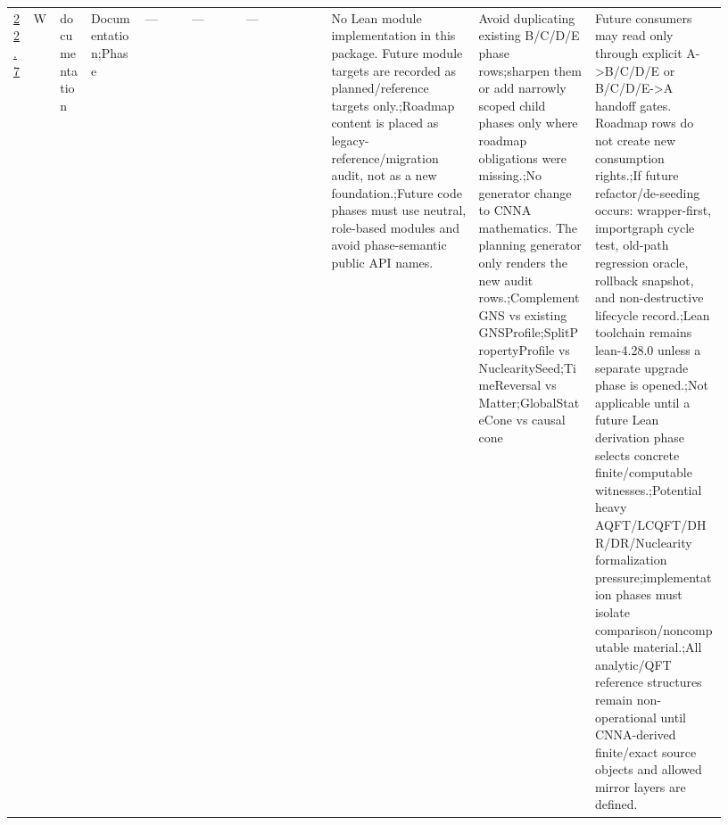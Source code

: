 \begin{longtable}{L{0.026\linewidth} L{0.024\linewidth} L{0.045\linewidth} L{0.07\linewidth} L{0.065\linewidth} L{0.075\linewidth} L{0.11\linewidth} L{0.19\linewidth} L{0.155\linewidth} L{0.17\linewidth}}
\hline
\addlinespace[0.24em]
\hyperlink{phase-row-22-7}{22.7} & W & documentation & Documentation;\newline Phase & --- & --- & --- & No Lean module implementation in this package. Future module targets are recorded as planned/\allowbreak{}reference targets only.;\newline Roadmap content is placed as legacy-reference/\allowbreak{}migration audit, not as a new foundation.;\newline Future code phases must use neutral, role-based modules and avoid phase-semantic public API names. & Avoid duplicating existing B/\allowbreak{}C/\allowbreak{}D/\allowbreak{}E phase rows;\newline sharpen them or add narrowly scoped child phases only where roadmap obligations were missing.;\newline No generator change to CNNA mathematics. The planning generator only renders the new audit rows.;\newline ComplementGNS vs existing GNSProfile;\newline SplitPropertyProfile vs NuclearitySeed;\newline TimeReversal vs Matter;\newline GlobalStateCone vs causal cone & Future consumers may read only through explicit A->B/\allowbreak{}C/\allowbreak{}D/\allowbreak{}E or B/\allowbreak{}C/\allowbreak{}D/\allowbreak{}E->A handoff gates. Roadmap rows do not create new consumption rights.;\newline If future refactor/\allowbreak{}de-seeding occurs: wrapper-first, importgraph cycle test, old-path regression oracle, rollback snapshot, and non-destructive lifecycle record.;\newline Lean toolchain remains lean-4.28.0 unless a separate upgrade phase is opened.;\newline Not applicable until a future Lean derivation phase selects concrete finite/\allowbreak{}computable witnesses.;\newline Potential heavy AQFT/\allowbreak{}LCQFT/\allowbreak{}DHR/\allowbreak{}DR/\allowbreak{}Nuclearity formalization pressure;\newline implementation phases must isolate comparison/\allowbreak{}noncomputable material.;\newline All analytic/\allowbreak{}QFT reference structures remain non-operational until CNNA-derived finite/\allowbreak{}exact source objects and allowed mirror layers are defined.\\

\end{longtable}
